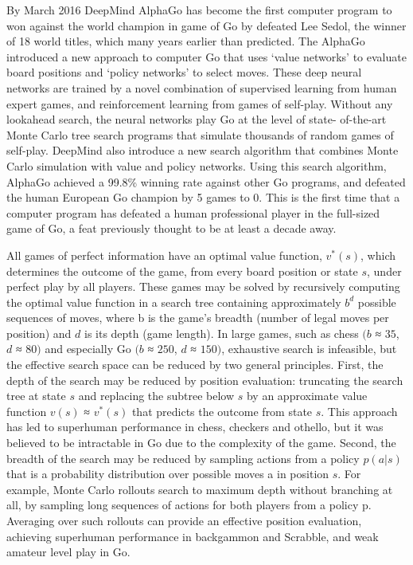 \documentclass[12pt,a4paper]{article}
\begin{document}
{
\hspace{0.6cm} By March 2016 DeepMind AlphaGo has become the first computer program to won against the world champion in game of Go by defeated Lee Sedol, the winner of 18 world titles, which many years earlier than predicted\cite{GovsCom}\cite{AGWeb}. The AlphaGo introduced a new approach to computer Go that uses ‘value networks’ to evaluate board positions and ‘policy networks’ to select moves. These deep neural networks are trained by a novel combination of supervised learning from human expert games, and reinforcement learning from games of self-play. Without any lookahead search, the neural networks play Go at the level of state- of-the-art Monte Carlo tree search programs that simulate thousands of random games of self-play. DeepMind also introduce a new search algorithm that combines Monte Carlo simulation with value and policy networks. Using this search algorithm, AlphaGo achieved a 99.8\% winning rate against other Go programs, and defeated the human European Go champion by 5 games to 0. This is the first time that a computer program has defeated a human professional player in the full-sized game of Go, a feat previously thought to be at least a decade away\cite{AlphaGo}.\par
\hspace{0cm} All games of perfect information have an optimal value function, \(v^*(s)\), which determines the outcome of the game, from every board position or state \(s\), under perfect play by all players. These games may be solved by recursively computing the optimal value function in a search tree containing approximately \(b^d\) possible sequences of moves, where b is the game’s breadth (number of legal moves per position) and \(d\) is its depth (game length). In large games, such as chess \((b\) ≈ \(35\), \(d\) ≈ \(80)\)\cite{AISearching} and especially Go \((b\) ≈ \(250\), \(d\) ≈ \(150)\)\cite{AISearching}, exhaustive search is infeasible\cite{Solved}\cite{Thegamesplay}, but the effective search space can be reduced by two general principles. First, the depth of the search may be reduced by position evaluation: truncating the search tree at state \(s\) and replacing the subtree below \(s\) by an approximate value function \(v(s)\) ≈ \(v^*(s)\) that predicts the outcome from state \(s\). This approach has led to superhuman performance in chess\cite{DeepBlue}, checkers\cite{Caliber} and othello\cite{BuroOth}, but it was believed to be intractable in Go due to the complexity of the game\cite{MullerComGo}. Second, the breadth of the search may be reduced by sampling actions from a policy \(p(a|s)\) that is a probability distribution over possible moves a in position \(s\). For example, Monte Carlo rollouts\cite{MCR} search to maximum depth without branching at all, by sampling long sequences of actions for both players from a policy p. Averaging over such rollouts can provide an effective position evaluation, achieving superhuman performance in backgammon\cite{MCR} and Scrabble\cite{Scrabble}, and weak amateur level play in Go\cite{Bouzy_2004}.\par
}
\end{document}
